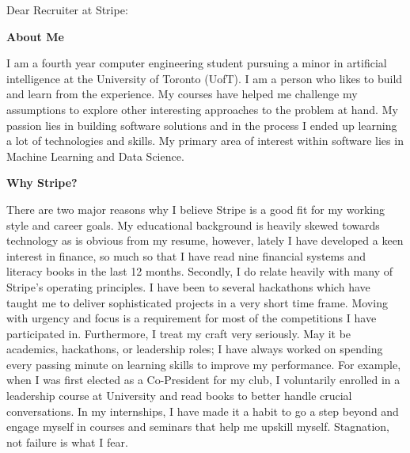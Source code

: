 \documentclass[a4paper,english]{friggeri-letter}
\begin{document}

\address{
   85 Wood St \\
   Toronto, ON, Canada
}





\opening{Dear Recruiter at Stripe:}

\textbf{About Me}

I am a fourth year computer engineering student pursuing a minor in artificial intelligence at the University of Toronto (UofT). I am a person who likes to build and learn from the experience. My courses have helped me challenge my assumptions to explore other interesting approaches to the problem at hand. My passion lies in building software solutions and in the process I ended up learning a lot of technologies and skills. My primary area of interest within software lies in Machine Learning and Data Science.



\textbf{Why Stripe?}

There are two major reasons why I believe Stripe is a good fit for my working style and career goals. My educational background is heavily skewed towards technology as is obvious from my resume, however, lately I have developed a keen interest in finance, so much so that I have read nine financial systems and literacy books in the last 12 months. Secondly, I do relate heavily with many of Stripe's operating principles. 
I have been to several hackathons which have taught me to deliver sophisticated projects in a very short time frame. Moving with urgency and focus is a requirement for most of the competitions I have participated in. 
Furthermore, I treat my craft very seriously. May it be academics, hackathons, or leadership roles; I have always worked on spending every passing minute on learning skills to improve my performance. 
For example, when I was first elected as a Co-President for my club, I voluntarily enrolled in a leadership course at University and read books to better handle crucial conversations. 
In my internships, I have made it a habit to go a step beyond and engage myself in courses and seminars that help me upskill myself. Stagnation, not failure is what I fear.
\end{document}
